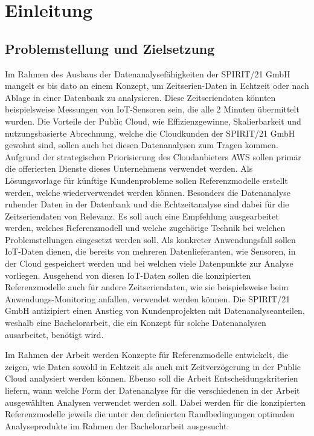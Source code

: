 \chapter{Einleitung}

\section{Problemstellung und Zielsetzung}
Im Rahmen des Ausbaus der Datenanalysefähigkeiten der SPIRIT/21 GmbH mangelt es bis dato an einem Konzept, um
Zeitserien-Daten in Echtzeit oder nach Ablage in einer Datenbank zu analysieren. 
Diese Zeitseriendaten könnten beispielsweise Messungen von \ac{IoT}-Sensoren sein, die alle 2 Minuten übermittelt wurden. Die Vorteile der Public Cloud, wie Effizienzgewinne, Skalierbarkeit und nutzungsbasierte Abrechnung, welche die Cloudkunden der SPIRIT/21 GmbH gewohnt sind, sollen auch bei diesen Datenanalysen zum Tragen kommen. 
Aufgrund der strategischen Priorisierung des Cloudanbieters \ac{AWS} sollen primär die offerierten Dienste dieses Unternehmens verwendet werden.
Als Lösungsvorlage für künftige Kundenprobleme sollen Referenzmodelle erstellt werden, welche wiederverwendet werden
können. Besonders die Datenanalyse ruhender Daten in der Datenbank und die Echtzeitanalyse sind dabei für die
Zeitseriendaten von Relevanz. Es soll auch eine Empfehlung ausgearbeitet werden, welches Referenzmodell und welche
zugehörige Technik bei welchen Problemstellungen eingesetzt werden soll. Als konkreter Anwendungsfall sollen \ac{IoT}-Daten dienen, die bereits von mehreren Datenlieferanten, wie Sensoren, in der Cloud gespeichert werden und bei welchen viele Datenpunkte zur Analyse vorliegen. Ausgehend von diesen \ac{IoT}-Daten sollen die konzipierten Referenzmodelle auch für andere Zeitseriendaten, wie sie beispielsweise beim Anwendungs-Monitoring anfallen, verwendet werden können. 
Die SPIRIT/21 GmbH antizipiert einen Anstieg von Kundenprojekten mit Datenanalyseanteilen, weshalb eine Bachelorarbeit, die ein Konzept für solche Datenanalysen ausarbeitet, benötigt wird.

Im Rahmen der Arbeit werden Konzepte für Referenzmodelle entwickelt, die zeigen, wie Daten sowohl in Echtzeit als auch mit Zeitverzögerung in der Public Cloud analysiert werden können. 
Ebenso soll die Arbeit Entscheidungskriterien liefern, wann welche Form der Datenanalyse für die verschiedenen in der Arbeit ausgewählten Analysen verwendet werden soll. 
Dabei werden für die konzipierten Referenzmodelle jeweils die unter den definierten Randbedingungen optimalen Analyseprodukte im Rahmen der Bachelorarbeit ausgesucht.

